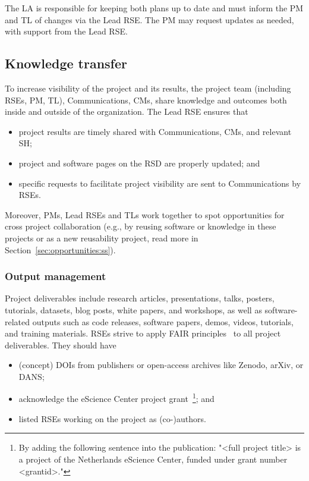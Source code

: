 The LA is responsible for keeping both plans up to date and must inform the PM and TL of changes via the Lead RSE. The PM may request updates as needed, with support from the Lead RSE.


\subsection{Knowledge transfer}

To increase visibility of the project and its results, the project team (including RSEs, PM, TL), Communications, CMs,
share knowledge and outcomes both inside and outside of the organization. The Lead RSE ensures that
\begin{itemize}
\item project results are timely shared with Communications, CMs, and relevant SH;
\item project and software pages on the RSD are properly updated; and
\item specific requests to facilitate project visibility are sent to Communications by RSEs.
\end{itemize}

Moreover, PMs, Lead RSEs and TLs work together to spot opportunities for cross project collaboration (e.g., by reusing
software or knowledge in these projects or as a new reusability project, read more in Section~\ref{sec:opportunities:ss}).



\subsubsection{Output management}
\label{sec:exec:output}
Project deliverables include research articles, presentations, talks, posters, tutorials, datasets, blog posts, white papers, and workshops, 
as well as software-related outputs such as code releases, software papers, demos, videos, tutorials, and training materials. 
%
RSEs strive to apply FAIR principles~\cite{fair-principles,FAIR4RS} to all project deliverables. They should have
\begin{itemize}\itemsep0em
\item (concept) DOIs from publishers or open-access archives like Zenodo, arXiv, or DANS;
\item acknowledge the eScience Center project grant~\footnote{By adding the following sentence into the publication: "<full project title> is a project of the Netherlands eScience Center, funded under grant number <grantid>."}; and
\item listed RSEs working on the project as (co-)authors.
\end{itemize}

